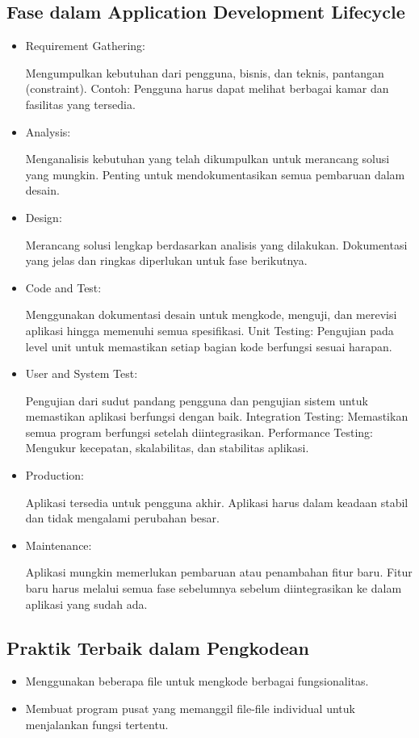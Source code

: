 \documentclass{article}
\begin{document}
\subsection{Fase dalam Application Development Lifecycle}
\begin{itemize}
    \item Requirement Gathering:

          Mengumpulkan kebutuhan dari pengguna, bisnis, dan teknis, pantangan (constraint).
          Contoh: Pengguna harus dapat melihat berbagai kamar dan fasilitas yang tersedia.
    \item Analysis:

          Menganalisis kebutuhan yang telah dikumpulkan untuk merancang solusi yang mungkin.
          Penting untuk mendokumentasikan semua pembaruan dalam desain.
    \item Design:

          Merancang solusi lengkap berdasarkan analisis yang dilakukan.
          Dokumentasi yang jelas dan ringkas diperlukan untuk fase berikutnya.
    \item Code and Test:

          Menggunakan dokumentasi desain untuk mengkode, menguji, dan merevisi aplikasi hingga memenuhi semua spesifikasi.
          Unit Testing: Pengujian pada level unit untuk memastikan setiap bagian kode berfungsi sesuai harapan.
    \item User and System Test:

          Pengujian dari sudut pandang pengguna dan pengujian sistem untuk memastikan aplikasi berfungsi dengan baik.
          Integration Testing: Memastikan semua program berfungsi setelah diintegrasikan.
          Performance Testing: Mengukur kecepatan, skalabilitas, dan stabilitas aplikasi.
    \item Production:

          Aplikasi tersedia untuk pengguna akhir.
          Aplikasi harus dalam keadaan stabil dan tidak mengalami perubahan besar.
    \item Maintenance:

          Aplikasi mungkin memerlukan pembaruan atau penambahan fitur baru.
          Fitur baru harus melalui semua fase sebelumnya sebelum diintegrasikan ke dalam aplikasi yang sudah ada.
\end{itemize}

\subsection{Praktik Terbaik dalam Pengkodean}
\begin{itemize}
    \item Menggunakan beberapa file untuk mengkode berbagai fungsionalitas.
    \item Membuat program pusat yang memanggil file-file individual untuk menjalankan fungsi tertentu.
\end{itemize}
\end{document}
